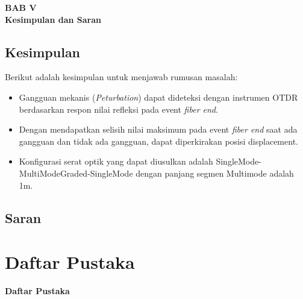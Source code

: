 \documentclass[12pt]{article}
\begin{document}
\begin{center}
	{\large \textbf{BAB V}} \\
	{\large \textbf{Kesimpulan dan Saran}}
\end{center}

\subsection{Kesimpulan}

Berikut adalah kesimpulan untuk menjawab rumusan masalah:

\begin{itemize}
	\item Gangguan mekanis (\textit{Peturbation}) dapat dideteksi dengan instrumen OTDR berdasarkan respon nilai refleksi pada event \textit{fiber end}.
	\item Dengan mendapatkan selisih nilai maksimum pada event \textit{fiber end} saat ada gangguan dan tidak ada gangguan, dapat diperkirakan posisi displacement.
	\item Konfigurasi serat optik yang dapat diusulkan adalah SingleMode-MultiModeGraded-SingleMode dengan panjang segmen Multimode adalah 1m.
\end{itemize}
	
\subsection{Saran}


\newpage
\thispagestyle{empty}
\mbox{}

\newpage

	\section{Daftar Pustaka}
	
	\begin{center}
		\textbf{Daftar Pustaka}
	\end{center}
	
	
	

	
\end{document}
